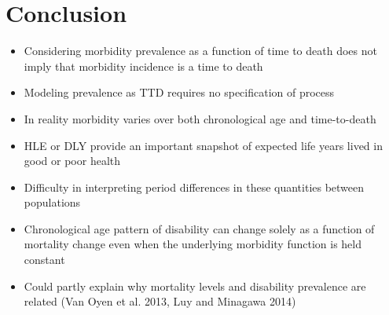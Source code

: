 \documentclass[20pt]{beamer}
\begin{document}
\section{Conclusion}

\begin{frame}[plain]
\begin{itemize}[<+>]
\item Considering morbidity prevalence as a function of time to death does not imply that morbidity incidence is a time to death
\item Modeling prevalence as TTD requires no specification of process
\item In reality morbidity varies over both chronological age and time-to-death
\end{itemize}
\end{frame}
\begin{frame}[plain]
\begin{itemize}[<+>]
\item HLE or DLY provide an important snapshot of expected life years lived in good or poor health
\item Difficulty in interpreting period differences in these quantities between populations 
\item Chronological age pattern of disability can change solely as a function of mortality change even when the underlying morbidity function is held constant
\item Could partly explain why mortality levels and disability prevalence are related (Van Oyen et al. 2013, Luy and Minagawa 2014)
\end{itemize}
\end{frame}



%
\end{document}
